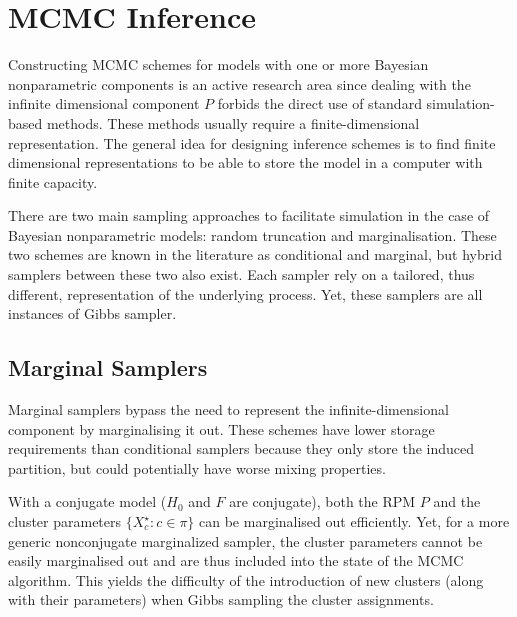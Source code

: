\section{MCMC Inference}
Constructing \gls{MCMC} schemes for models with one or more Bayesian nonparametric components is an active research area since dealing with the infinite dimensional component $P$ forbids the direct use of standard simulation-based methods. These methods usually require a finite-dimensional representation. The general idea for designing inference schemes is to find finite dimensional representations to be able to store the model in a computer with finite capacity.

There are two main sampling approaches to facilitate simulation in the case of Bayesian nonparametric models: random truncation and marginalisation. These two schemes are known in the literature as conditional and marginal, but hybrid samplers between these two also exist. Each sampler rely on a tailored, thus different, representation of the underlying process. Yet, these samplers are all instances of Gibbs sampler.

\subsection{Marginal Samplers}

Marginal samplers bypass the need to represent the infinite-dimensional component by marginalising it out. These schemes have lower storage requirements than conditional samplers because they only store the induced partition, but could potentially have worse mixing properties.

With a conjugate model ($H_0$ and $F$ are conjugate), both the \gls{RPM} $P$ and the cluster parameters $\{X_c^\star: c \in \pi \}$ can be marginalised out efficiently. Yet, for a more generic nonconjugate marginalized sampler, the cluster parameters cannot be easily marginalised out and are thus included into the state of the \gls{MCMC} algorithm. This yields the difficulty of the introduction of new clusters (along with their parameters) when Gibbs sampling the cluster assignments.

